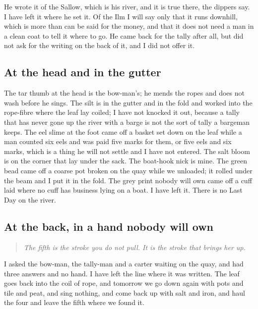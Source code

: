 \documentclass{design/chronicle}
\begin{document}
He wrote it of the Sallow, which is his river, and it is true there, the dippers say. I have left it where he set it. Of the Ilm I will say only that it runs downhill, which is more than can be said for the money, and that it does not need a man in a clean coat to tell it where to go. He came back for the tally after all, but did not ask for the writing on the back of it, and I did not offer it.

\subsection*{At the head and in the gutter}

The tar thumb at the head is the bow-man’s; he mends the ropes and does not wash before he sings. The silt is in the gutter and in the fold and worked into the rope-fibre where the leaf lay coiled; I have not knocked it out, because a tally that has never gone up the river with a barge is not the sort of tally a bargeman keeps. The eel slime at the foot came off a basket set down on the leaf while a man counted six eels and was paid five marks for them, or five eels and six marks, which is a thing he will not settle and I have not entered. The salt bloom is on the corner that lay under the sack. The boat-hook nick is mine. The green bead came off a coarse pot broken on the quay while we unloaded; it rolled under the beam and I put it in the fold. The grey print nobody will own came off a cuff laid where no cuff has business lying on a boat. I have left it. There is no Last Day on the river.

\subsection*{At the back, in a hand nobody will own}

\begin{quote}\itshape The fifth is the stroke you do not pull. It is the stroke that brings her up.\end{quote}

I asked the bow-man, the tally-man and a carter waiting on the quay, and had three answers and no hand. I have left the line where it was written. The leaf goes back into the coil of rope, and tomorrow we go down again with pots and tile and peat, and sing nothing, and come back up with salt and iron, and haul the four and leave the fifth where we found it.
\end{document}
